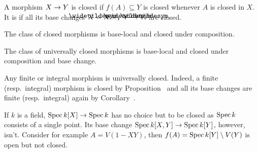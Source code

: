 \documentclass[a4paper,parskip=half,numbers=enddot, DIV=12]{scrreprt}
\begin{document}
\begin{defi}
    A morphism $X\morphism Y$ is closed if $f(A)\subseteq Y$ is closed whenever $A$ is closed in $X$. It is  if all its base changes $\snake X = X\times_Y \snake Y \morphism \snake Y$ are closed.
\end{defi}
\begin{rem}
    \begin{alphanumerate}
    \item {}
        The class of closed morphisms is base-local and closed under composition.
    \item  
        The class of universally closed morphisms is base-local and closed under composition and base change.
    \item 
        Any finite or integral morphism is universally closed. Indeed, a finite (resp.\ integral) morphism is closed by Proposition~ and all its base changes are finite (resp.\ integral) again by Corollary~.
    \end{alphanumerate}
\end{rem}
\begin{example}
	If $k$ is a field, $\Spec k[X]\morphism\Spec k$ has no choice but to be closed as $\operatorname{Spec} k$ consists of a single point. Its base change $\Spec k[X,Y]\morphism\Spec k[Y]$, however, isn't. Consider for example $A=V(1-XY)$, then $f(A)=\operatorname{Spec} k[Y]\setminus V(Y)$ is open but not closed.
\end{example}
\end{document}

